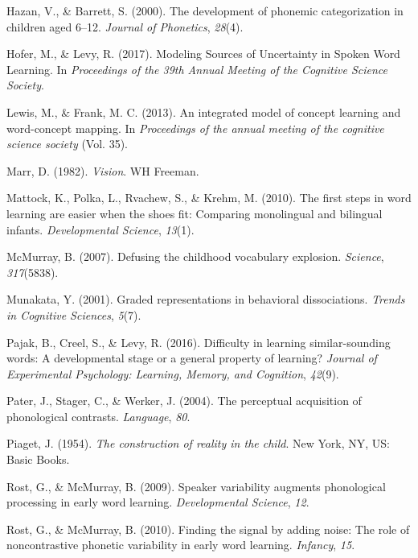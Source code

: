 \documentclass[english,,man]{apa6}
\begin{document}
\leavevmode\hypertarget{ref-hazan2000}{}%
Hazan, V., \& Barrett, S. (2000). The development of phonemic categorization in children aged 6--12. \emph{Journal of Phonetics}, \emph{28}(4).

\leavevmode\hypertarget{ref-hofer2017}{}%
Hofer, M., \& Levy, R. (2017). Modeling Sources of Uncertainty in Spoken Word Learning. In \emph{Proceedings of the 39th Annual Meeting of the Cognitive Science Society}.

\leavevmode\hypertarget{ref-lewis2013}{}%
Lewis, M., \& Frank, M. C. (2013). An integrated model of concept learning and word-concept mapping. In \emph{Proceedings of the annual meeting of the cognitive science society} (Vol. 35).

\leavevmode\hypertarget{ref-marr1982}{}%
Marr, D. (1982). \emph{Vision}. WH Freeman.

\leavevmode\hypertarget{ref-Mattock2010}{}%
Mattock, K., Polka, L., Rvachew, S., \& Krehm, M. (2010). The first steps in word learning are easier when the shoes fit: Comparing monolingual and bilingual infants. \emph{Developmental Science}, \emph{13}(1).

\leavevmode\hypertarget{ref-McMurray2007}{}%
McMurray, B. (2007). Defusing the childhood vocabulary explosion. \emph{Science}, \emph{317}(5838).

\leavevmode\hypertarget{ref-Munakata2001}{}%
Munakata, Y. (2001). Graded representations in behavioral dissociations. \emph{Trends in Cognitive Sciences}, \emph{5}(7).

\leavevmode\hypertarget{ref-pajak2016}{}%
Pajak, B., Creel, S., \& Levy, R. (2016). Difficulty in learning similar-sounding words: A developmental stage or a general property of learning? \emph{Journal of Experimental Psychology: Learning, Memory, and Cognition}, \emph{42}(9).

\leavevmode\hypertarget{ref-pater2004}{}%
Pater, J., Stager, C., \& Werker, J. (2004). The perceptual acquisition of phonological contrasts. \emph{Language}, \emph{80}.

\leavevmode\hypertarget{ref-piaget1954}{}%
Piaget, J. (1954). \emph{The construction of reality in the child}. New York, NY, US: Basic Books.

\leavevmode\hypertarget{ref-rost2009}{}%
Rost, G., \& McMurray, B. (2009). Speaker variability augments phonological processing in early word learning. \emph{Developmental Science}, \emph{12}.

\leavevmode\hypertarget{ref-rost2010}{}%
Rost, G., \& McMurray, B. (2010). Finding the signal by adding noise: The role of noncontrastive phonetic variability in early word learning. \emph{Infancy}, \emph{15}.
\end{document}
